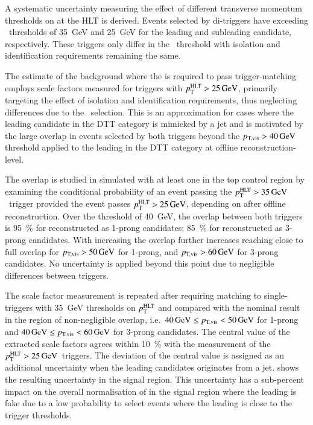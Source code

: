 A systematic uncertainty measuring the effect of different transverse
momentum thresholds on \tauhadvis at the HLT is derived.  Events
selected by di-\tauhadvis triggers have \tauhadvis exceeding
\pTHLT~thresholds of \SI{35}{\GeV} and \SI{25}{\GeV} for the leading
and subleading candidate, respectively. These triggers only differ in
the \pTHLT~threshold with isolation and identification requirements
remaining the same.

The estimate of the \ttbarFakes background where the \faketauhadvis is
required to pass trigger-matching employs scale factors measured for
triggers with $p_{\text{T}}^{\text{HLT}} > \SI{25}{\ensuremath{\text{GeV}}}$, primarily targeting the effect
of isolation and identification requirements, thus neglecting
differences due to the \pTHLT~selection. This is an approximation for
cases where the leading \tauhadvis candidate in the DTT category is
mimicked by a jet and is motivated by the large overlap in events
selected by both triggers beyond the $\pTvis > \SI{40}{\GeV}$
threshold applied to the leading \tauhadvis in the DTT category at
offline reconstruction-level.

The overlap is studied in simulated \ttbar with at least one
\faketauhadvis in the top control region by examining the
conditional probability of an event passing the
$p_{\text{T}}^{\text{HLT}} > \SI{35}{\ensuremath{\text{GeV}}}$~trigger provided the event passes
$p_{\text{T}}^{\text{HLT}} > \SI{25}{\ensuremath{\text{GeV}}}$, depending on \pTvis after offline \tauhadvis
reconstruction. Over the \pTvis threshold of \SI{40}{\GeV}, the
overlap between both triggers is \SI{95}{\percent} for \faketauhadvis
reconstructed as 1-prong candidates; \SI{85}{\percent} for
\faketauhadvis reconstructed as 3-prong candidates.  With
increasing \pTvis the overlap further increases reaching close to full
overlap for $p_\text{T,vis} > \SI{50}{\ensuremath{\text{GeV}}}$ for 1-prong, and
$p_\text{T,vis} > \SI{60}{\ensuremath{\text{GeV}}}$ for 3-prong candidates. No uncertainty is
applied beyond this point due to negligible differences between
triggers.

The scale factor measurement is repeated after requiring matching to
single-\tauhadvis triggers with \SI{35}{\GeV} thresholds on $p_{\text{T}}^{\text{HLT}}$
and compared with the nominal result in the region of non-negligible
overlap, i.e.\ $\SI{40}{\ensuremath{\text{GeV}}} \leq p_\text{T,vis} < \SI{50}{\ensuremath{\text{GeV}}}$ for 1-prong
and $\SI{40}{\ensuremath{\text{GeV}}} \leq p_\text{T,vis} < \SI{60}{\ensuremath{\text{GeV}}}$ for 3-prong
candidates. The central value of the extracted scale factors agrees
within \SI{10}{\percent} with the measurement of the
$p_{\text{T}}^{\text{HLT}} > \SI{25}{\ensuremath{\text{GeV}}}$~triggers. The deviation of the central value
is assigned as an additional uncertainty when the leading \tauhadvis
candidates originates from a
jet.  shows the resulting
uncertainty in the \hadhad signal region. This uncertainty has a sub-percent impact on the overall
normalisation of \ttbar in the signal region where the leading
\tauhadvis is fake due to a low probability to select events where the
leading \tauhadvis is close to the trigger thresholds.

